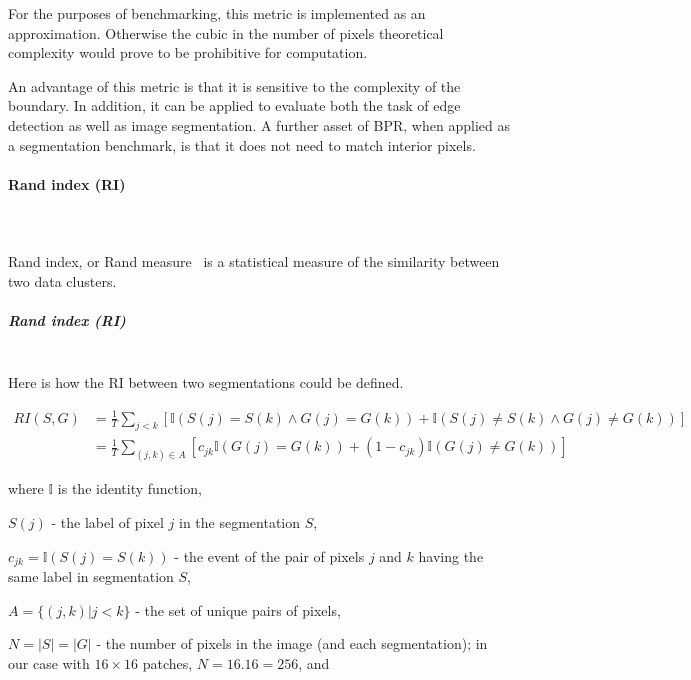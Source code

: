 For the purposes of benchmarking, this metric is implemented as an approximation. Otherwise the cubic in the number of pixels %
theoretical complexity would prove to be prohibitive for computation.

An advantage of this  metric is that it is sensitive to the complexity of the boundary. In addition, it can be applied %
to evaluate both the task of edge detection as well as image segmentation. A further asset of BPR, when applied as a segmentation benchmark, is that it does not need to match interior pixels.

\paragraph{Rand index (RI)}\mbox{}\\\mbox{}\\
Rand index, or Rand measure~\cite{rand1971objective} is a statistical measure of the similarity between two data clusters.

\subparagraph{Rand index (RI)}\mbox{}\\
\label{par:ch4-RI-maths}
Here is how the RI between two segmentations could be defined.

\begin{align*}
RI(S,G) & =\frac{1}{T}\sum\limits _{j<k}\left[\mathbb{I}\left(S(j)=S(k)\wedge G(j)=G(k)\right)+\mathbb{I}\left(S(j)\neq S(k)\wedge G(j)\neq G(k)\right)\right]\\
 & =\frac{1}{T}\sum\limits _{(j,k)\in A}\left[c_{jk}\mathbb{I}\left(G(j)=G(k)\right)+(1-c_{jk})\mathbb{I}\left(G(j)\neq G(k)\right)\right]
\end{align*}

where $\mathbb{I}$ is the identity function,

$S(j)$ - the label of pixel $j$ in the segmentation $S$,

$c_{jk}=\mathbb{I}\left(S(j)=S(k)\right)$ - the event of the pair
of pixels $j$ and $k$ having the same label in segmentation $S$,

$A=\{(j,k)|j<k\}$ - the set of unique pairs of pixels,

$N=\left|S\right|=\left|G\right|$ - the number of pixels in the image
(and each segmentation); in our case with $16\times 16$ patches, $N=16 . 16 = 256$, and 

